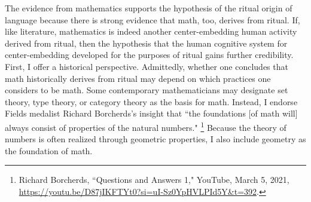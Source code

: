 \documentclass[12pt, letterpaper]{article}
\begin{document}
\vspace{1em}
The evidence from mathematics supports the hypothesis of the ritual origin of language because there is strong evidence that math, too, derives from ritual. 
If, like literature, mathematics is indeed another center-embedding human activity derived from ritual, then the hypothesis that the human cognitive system for center-embedding developed for the purposes of ritual gains further credibility. 
First, I offer a historical perspective. 
Admittedly, whether one concludes that math historically derives from ritual may depend on which practices one considers to be math. 
Some contemporary mathematicians may designate set theory, type theory, or category theory as the basis for math. 
Instead, I endorse Fields medalist Richard Borcherds's insight that ``the foundations [of math will] always consist of properties of the natural numbers."%
\footnote{Richard Borcherds, ``Questions and Answers 1," YouTube, March 5, 2021, \url{https://youtu.be/D87jIKFTYt0?si=uI-Sz0YpHVLPId5Y&t=392}.}
Because the theory of numbers is often realized through geometric properties, I also include geometry as the foundation of math. 
\end{document}

